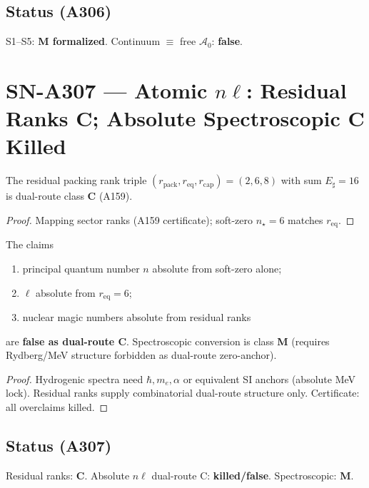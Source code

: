 \subsection*{Status (A306)}
S1--S5: \textbf{M formalized}. Continuum $\equiv$ free $\mathcal{A}_0$: \textbf{false}.

\section{SN-A307 --- Atomic $n\ell$: Residual Ranks C; Absolute Spectroscopic C Killed}
\label{sec:SN-A307}

\begin{theorem}
\label{thm:A307-ranks}
The residual packing rank triple $(r_{\mathrm{pack}},r_{\mathrm{eq}},r_{\mathrm{cap}})=(2,6,8)$
with sum $E_\sharp=16$ is dual-route class \textbf{C} (A159).
\end{theorem}

\begin{proof}
Mapping sector ranks (A159 certificate); soft-zero $n_\star=6$ matches $r_{\mathrm{eq}}$.
\end{proof}

\begin{theorem}
\label{thm:A307-kill}
The claims
\begin{enumerate}[label=(\roman*)]
\item principal quantum number $n$ absolute from soft-zero alone;
\item $\ell$ absolute from $r_{\mathrm{eq}}=6$;
\item nuclear magic numbers absolute from residual ranks
\end{enumerate}
are \textbf{false as dual-route C}. Spectroscopic conversion is class \textbf{M}
(requires Rydberg/MeV structure forbidden as dual-route zero-anchor).
\end{theorem}

\begin{proof}
Hydrogenic spectra need $\hbar,m_e,\alpha$ or equivalent SI anchors (absolute MeV lock).
Residual ranks supply combinatorial dual-route structure only. Certificate: all overclaims killed.
\end{proof}

\subsection*{Status (A307)}
Residual ranks: \textbf{C}. Absolute $n\ell$ dual-route C: \textbf{killed/false}. Spectroscopic: \textbf{M}.

